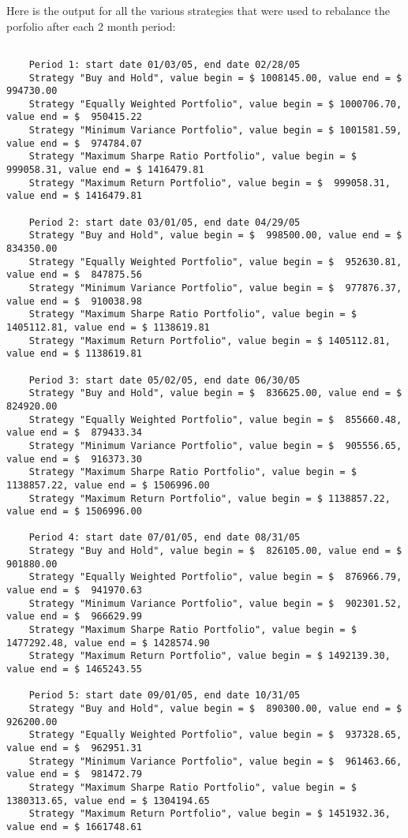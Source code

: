 \documentclass[english]{scrartcl}
\begin{document}
	Here is the output for all the various strategies that were used to rebalance the porfolio after each 2 month period:
	\begin{verbatim}
	
	Period 1: start date 01/03/05, end date 02/28/05
	Strategy "Buy and Hold", value begin = $ 1008145.00, value end = $  994730.00
	Strategy "Equally Weighted Portfolio", value begin = $ 1000706.70, value end = $  950415.22
	Strategy "Minimum Variance Portfolio", value begin = $ 1001581.59, value end = $  974784.07
	Strategy "Maximum Sharpe Ratio Portfolio", value begin = $  999058.31, value end = $ 1416479.81
	Strategy "Maximum Return Portfolio", value begin = $  999058.31, value end = $ 1416479.81
	
	Period 2: start date 03/01/05, end date 04/29/05
	Strategy "Buy and Hold", value begin = $  998500.00, value end = $  834350.00
	Strategy "Equally Weighted Portfolio", value begin = $  952630.81, value end = $  847875.56
	Strategy "Minimum Variance Portfolio", value begin = $  977876.37, value end = $  910038.98
	Strategy "Maximum Sharpe Ratio Portfolio", value begin = $ 1405112.81, value end = $ 1138619.81
	Strategy "Maximum Return Portfolio", value begin = $ 1405112.81, value end = $ 1138619.81
	
	Period 3: start date 05/02/05, end date 06/30/05
	Strategy "Buy and Hold", value begin = $  836625.00, value end = $  824920.00
	Strategy "Equally Weighted Portfolio", value begin = $  855660.48, value end = $  879433.34
	Strategy "Minimum Variance Portfolio", value begin = $  905556.65, value end = $  916373.30
	Strategy "Maximum Sharpe Ratio Portfolio", value begin = $ 1138857.22, value end = $ 1506996.00
	Strategy "Maximum Return Portfolio", value begin = $ 1138857.22, value end = $ 1506996.00
	
	Period 4: start date 07/01/05, end date 08/31/05
	Strategy "Buy and Hold", value begin = $  826105.00, value end = $  901880.00
	Strategy "Equally Weighted Portfolio", value begin = $  876966.79, value end = $  941970.63
	Strategy "Minimum Variance Portfolio", value begin = $  902301.52, value end = $  966629.99
	Strategy "Maximum Sharpe Ratio Portfolio", value begin = $ 1477292.48, value end = $ 1428574.90
	Strategy "Maximum Return Portfolio", value begin = $ 1492139.30, value end = $ 1465243.55
	
	Period 5: start date 09/01/05, end date 10/31/05
	Strategy "Buy and Hold", value begin = $  890300.00, value end = $  926200.00
	Strategy "Equally Weighted Portfolio", value begin = $  937328.65, value end = $  962951.31
	Strategy "Minimum Variance Portfolio", value begin = $  961463.66, value end = $  981472.79
	Strategy "Maximum Sharpe Ratio Portfolio", value begin = $ 1380313.65, value end = $ 1304194.65
	Strategy "Maximum Return Portfolio", value begin = $ 1451932.36, value end = $ 1661748.61
	

\end{verbatim}
\end{document}
